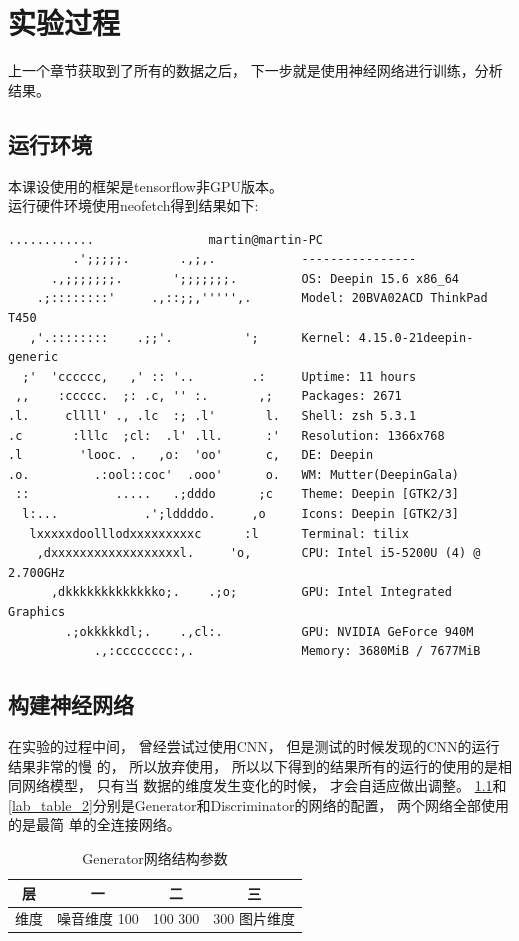 \chapter{实验过程}
上一个章节获取到了所有的数据之后， 下一步就是使用神经网络进行训练，分析结果。

\section{运行环境}

本课设使用的框架是tensorflow非GPU版本。\\
运行硬件环境使用neofetch得到结果如下:
\begin{Verbatim}[]
             ............                martin@martin-PC 
         .';;;;;.       .,;,.            ---------------- 
      .,;;;;;;;.       ';;;;;;;.         OS: Deepin 15.6 x86_64 
    .;::::::::'     .,::;;,''''',.       Model: 20BVA02ACD ThinkPad T450 
   ,'.::::::::    .;;'.          ';      Kernel: 4.15.0-21deepin-generic 
  ;'  'cccccc,   ,' :: '..        .:     Uptime: 11 hours 
 ,,    :ccccc.  ;: .c, '' :.       ,;    Packages: 2671 
.l.     cllll' ., .lc  :; .l'       l.   Shell: zsh 5.3.1 
.c       :lllc  ;cl:  .l' .ll.      :'   Resolution: 1366x768 
.l        'looc. .   ,o:  'oo'      c,   DE: Deepin 
.o.         .:ool::coc'  .ooo'      o.   WM: Mutter(DeepinGala) 
 ::            .....   .;dddo      ;c    Theme: Deepin [GTK2/3] 
  l:...            .';lddddo.     ,o     Icons: Deepin [GTK2/3] 
   lxxxxxdoolllodxxxxxxxxxc      :l      Terminal: tilix 
    ,dxxxxxxxxxxxxxxxxxxl.     'o,       CPU: Intel i5-5200U (4) @ 2.700GHz 
      ,dkkkkkkkkkkkkko;.    .;o;         GPU: Intel Integrated Graphics 
        .;okkkkkdl;.    .,cl:.           GPU: NVIDIA GeForce 940M 
            .,:cccccccc:,.               Memory: 3680MiB / 7677MiB 
\end{Verbatim}
\section{构建神经网络}
在实验的过程中间， 曾经尝试过使用CNN， 但是测试的时候发现的CNN的运行结果非常的慢
的， 所以放弃使用， 所以以下得到的结果所有的运行的使用的是相同网络模型， 只有当
数据的维度发生变化的时候， 才会自适应做出调整。 \ref{lab_table_1}和
\ref{lab_table_2}分别是Generator和Discriminator的网络的配置， 两个网络全部使用的是最简
单的全连接网络。

\begin{table}[htb]
\centering
\label{lab_table_1}
\begin{tabular}{c|c|c|c}
\hline\hline

\textbf{层} & \textbf{一} & \textbf{二} & \textbf{三} \\
\hline\hline
维度    & 噪音维度 100 & 100  300 & 300  图片维度\\
\hline
\hline\hline
\end{tabular}
\caption{Generator网络结构参数}
\end{table}


